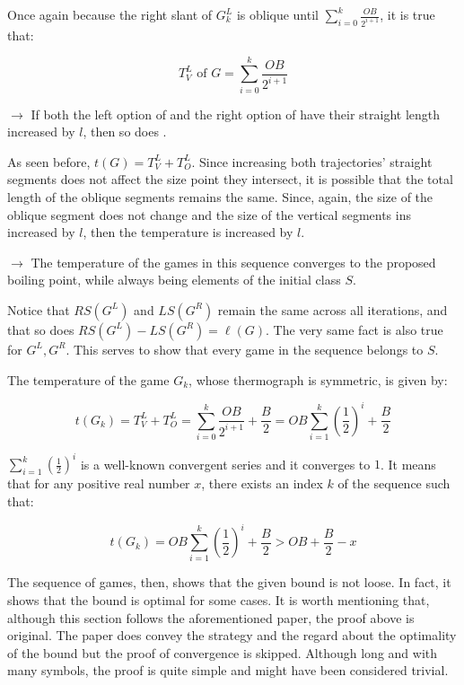 \begin{list}{}{}
	Once again because the right slant of $G_k^L$ is oblique until $\sum\limits_{i=0}^{k}\frac{OB}{2^{i+1}}$, it is true that:
	
	$$
	T^L_V \text{ of } G = \sum\limits_{i=0}^{k}\frac{OB}{2^{i+1}}
	$$
	
	\item[$\rightarrow$] If both the left option of  and the right option of  have their straight length increased by $l$, then so does \Gm{}.
	
	As seen before, $t(G) = T^L_V + T^L_O$. Since increasing both trajectories' straight segments does not affect the size point they intersect, it is possible that the total length of the oblique segments remains the same. Since, again, the size of the oblique segment does not change and the size of the vertical segments ins increased by $l$, then the temperature is increased by $l$.
	
	\item[$\rightarrow$] The temperature of the games in this sequence converges to the proposed boiling point, while always being elements of the initial class $S$.
	
	Notice that $RS(G^L)$ and $LS(G^R)$ remain the same across all iterations, and that so does $RS(G^L) - LS(G^R) = \ell(G)$. The very same fact is also true for $G^L, G^R$. This serves to show that every game in the sequence belongs to $S$.
	
	The temperature of the game $G_k$, whose thermograph is symmetric, is given by:
	
	$$t(G_k) = T^L_V + T^L_O = \sum\limits_{i=0}^{k}\frac{OB}{2^{i+1}} + \frac{B}{2} = OB \sum\limits_{i=1}^{k}(\frac{1}{2})^i + \frac{B}{2}$$
	
	$\sum\limits_{i=1}^{k}(\frac{1}{2})^i$ is a well-known convergent series and it converges to $1$. It means that for any positive real number $x$, there exists an index $k$ of the sequence such that:
	
	$$t(G_k) = OB \sum\limits_{i=1}^{k}(\frac{1}{2})^i + \frac{B}{2} > OB + \frac{B}{2} - x$$
	 
\end{list}

The sequence of games, then, shows that the given bound is not loose. In fact, it shows that the bound is optimal for some cases. It is worth mentioning that, although this section follows the aforementioned paper, the proof above is original. The paper does convey the strategy and the regard about the optimality of the bound but the proof of convergence is skipped. Although long and with many symbols, the proof is quite simple and might have been considered trivial.

